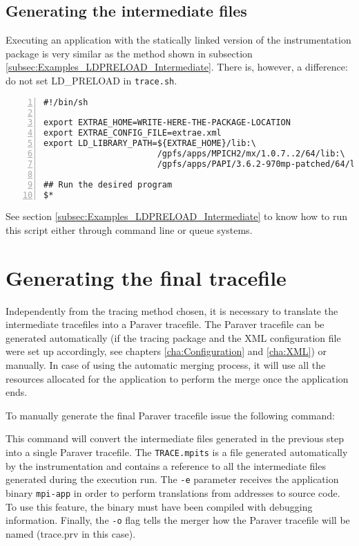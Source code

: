 \subsection{Generating the intermediate files}\label{subsec:Examples_static_Intermediate}

Executing an application with the statically linked version of the instrumentation package is very similar as the method shown in subsection \ref{subsec:Examples_LDPRELOAD_Intermediate}. There is, however, a difference: do not set LD\_PRELOAD in {\tt trace.sh}.

\begin{Verbatim}[frame=single,numbers=left,labelposition=topline,label=trace.sh]
#!/bin/sh

export EXTRAE_HOME=WRITE-HERE-THE-PACKAGE-LOCATION
export EXTRAE_CONFIG_FILE=extrae.xml
export LD_LIBRARY_PATH=${EXTRAE_HOME}/lib:\
                       /gpfs/apps/MPICH2/mx/1.0.7..2/64/lib:\
                       /gpfs/apps/PAPI/3.6.2-970mp-patched/64/lib

## Run the desired program
$*
\end{Verbatim}

See section \ref{subsec:Examples_LDPRELOAD_Intermediate} to know how to run this script either through command line or queue systems.

\section{Generating the final tracefile}\label{subsec:Examples_LDPRELOAD_Final}

Independently from the tracing method chosen, it is necessary to translate the intermediate tracefiles into a Paraver tracefile. The Paraver tracefile can be generated automatically (if the tracing package and the XML configuration file were set up accordingly, see chapters \ref{cha:Configuration} and \ref{cha:XML}) or manually. In case of using the automatic merging process, it will use all the resources allocated for the application to perform the merge once the application ends.

To manually generate the final Paraver tracefile issue the following command:


This command will convert the intermediate files generated in the previous step into a single Paraver tracefile. The {\tt TRACE.mpits} is a file generated automatically by the instrumentation and contains a reference to all the intermediate files generated during the execution run. The {\tt -e} parameter receives the application binary {\tt mpi-app} in order to perform translations from addresses to source code. To use this feature, the binary must have been compiled with debugging information. Finally, the {\tt -o} flag tells the merger how the Paraver tracefile will be named (trace.prv in this case).

